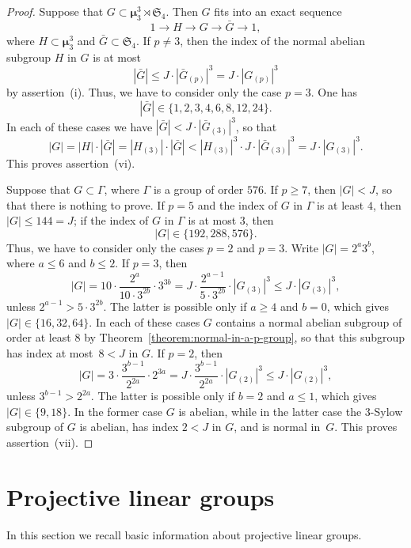 \documentclass[12pt]{amsart}
\numberwithin{equation}{section}
\theoremstyle{definition}
\newcommand{\mumu}{\boldsymbol{\mu}}
\def \ge {\geqslant}
\def \le {\leqslant}
\begin{document}
\begin{proof}
Suppose that $G\subset\mumu_3^3\rtimes \mathfrak{S}_4$.
Then $G$ fits into
an exact sequence
$$
1\to H\to G\to\bar{G}\to 1,
$$
where $H\subset \mumu_3^3$ and $\bar{G}\subset\mathfrak{S}_4$.
If $p\neq 3$, then the index of the normal abelian subgroup $H$ in $G$
is at most
$$
|\bar{G}|\le J\cdot |\bar{G}_{(p)}|^3=J\cdot |G_{(p)}|^3
$$
by assertion~(i).
Thus, we have to consider only the case $p=3$.
One has
$$
|\bar{G}|\in\{1,2,3,4,6,8,12,24\}.
$$
In each of these cases we have $|\bar{G}|< J\cdot |\bar{G}_{(3)}|^3$,
so that
$$
|G|=|H|\cdot |\bar{G}|=|H_{(3)}|\cdot |\bar{G}|< |H_{(3)}|^3\cdot J\cdot |\bar{G}_{(3)}|^3=
J\cdot |G_{(3)}|^3.
$$
This proves assertion~(vi).

Suppose that $G\subset\Gamma$, where $\Gamma$ is a group of order $576$.
If $p\ge 7$, then $|G|<J$, so that there is nothing to prove.
If $p=5$ and the index of $G$ in $\Gamma$ is at least $4$, then $|G|\le 144=J$;
if the index of $G$ in $\Gamma$ is at most $3$, then
$$
|G|\in\{192,288,576\}.
$$
Thus, we have to consider only the cases $p=2$ and $p=3$.
Write $|G|=2^a3^b$, where $a\le 6$ and $b\le 2$. If
$p=3$, then
$$
|G|=10\cdot \frac{2^a}{10\cdot 3^{2b}}\cdot 3^{3b}=
J\cdot \frac{2^{a-1}}{5\cdot 3^{2b}}\cdot |G_{(3)}|^3\le J\cdot |G_{(3)}|^3,
$$
unless $2^{a-1}>5\cdot 3^{2b}$. The latter is possible only if $a\ge 4$ and $b=0$, which
gives~\mbox{$|G|\in\{16,32,64\}$}. In each of these cases $G$ contains a normal abelian subgroup of
order at least $8$ by Theorem~\ref{theorem:normal-in-a-p-group}, so that this
subgroup has index at most~\mbox{$8<J$} in $G$.
If $p=2$, then
$$
|G|=3\cdot \frac{3^{b-1}}{2^{2a}}\cdot 2^{3a}=
J\cdot \frac{3^{b-1}}{2^{2a}}\cdot |G_{(2)}|^3\le J\cdot |G_{(2)}|^3,
$$
unless $3^{b-1}>2^{2a}$. The latter is possible only if $b=2$ and $a\le 1$, which
gives~\mbox{$|G|\in\{9,18\}$}. In the former case $G$ is abelian, while in the latter
case the $3$-Sylow subgroup of $G$ is abelian, has index $2<J$ in $G$, and is normal
in~$G$. This proves assertion~(vii).
\end{proof}




\section{Projective linear groups}
\label{section:PSL-PGL}

In this section we recall basic information about projective
linear groups.
\end{document}
